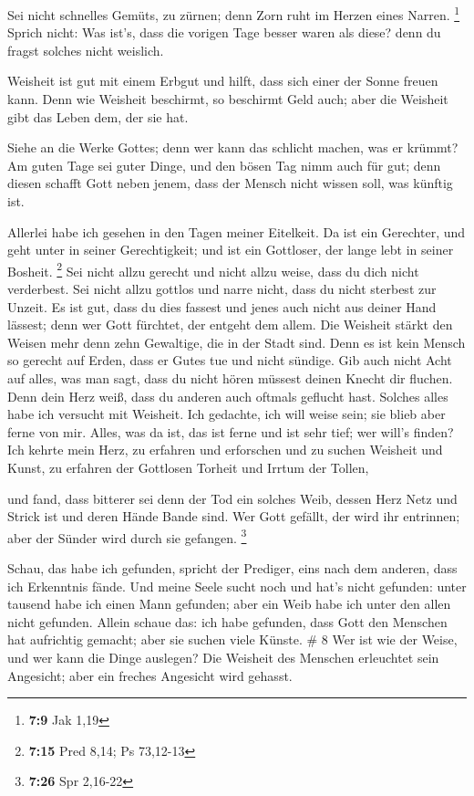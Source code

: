  Sei nicht schnelles Gemüts, zu zürnen; denn Zorn ruht im
Herzen eines Narren. \footnote{\textbf{7:9} Jak 1,19} 
Sprich nicht: Was ist's, dass die vorigen Tage besser waren als diese?
denn du fragst solches nicht weislich.

 Weisheit ist gut mit einem Erbgut und hilft, dass sich
einer der Sonne freuen kann.  Denn wie Weisheit beschirmt,
so beschirmt Geld auch; aber die Weisheit gibt das Leben dem, der sie
hat.

 Siehe an die Werke Gottes; denn wer kann das schlicht
machen, was er krümmt?  Am guten Tage sei guter Dinge, und
den bösen Tag nimm auch für gut; denn diesen schafft Gott neben jenem,
dass der Mensch nicht wissen soll, was künftig ist.

 Allerlei habe ich gesehen in den Tagen meiner Eitelkeit.
Da ist ein Gerechter, und geht unter in seiner Gerechtigkeit; und ist
ein Gottloser, der lange lebt in seiner Bosheit. \footnote{\textbf{7:15}
  Pred 8,14; Ps 73,12-13}  Sei nicht allzu gerecht und
nicht allzu weise, dass du dich nicht verderbest.  Sei
nicht allzu gottlos und narre nicht, dass du nicht sterbest zur Unzeit.
 Es ist gut, dass du dies fassest und jenes auch nicht aus
deiner Hand lässest; denn wer Gott fürchtet, der entgeht dem allem.
 Die Weisheit stärkt den Weisen mehr denn zehn Gewaltige,
die in der Stadt sind.  Denn es ist kein Mensch so gerecht
auf Erden, dass er Gutes tue und nicht sündige.  Gib auch
nicht Acht auf alles, was man sagt, dass du nicht hören müssest deinen
Knecht dir fluchen.  Denn dein Herz weiß, dass du anderen
auch oftmals geflucht hast.  Solches alles habe ich
versucht mit Weisheit. Ich gedachte, ich will weise sein; sie blieb aber
ferne von mir.  Alles, was da ist, das ist ferne und ist
sehr tief; wer will's finden?  Ich kehrte mein Herz, zu
erfahren und erforschen und zu suchen Weisheit und Kunst, zu erfahren
der Gottlosen Torheit und Irrtum der Tollen,

 und fand, dass bitterer sei denn der Tod ein solches Weib,
dessen Herz Netz und Strick ist und deren Hände Bande sind. Wer Gott
gefällt, der wird ihr entrinnen; aber der Sünder wird durch sie
gefangen. \footnote{\textbf{7:26} Spr 2,16-22}

 Schau, das habe ich gefunden, spricht der Prediger, eins
nach dem anderen, dass ich Erkenntnis fände.  Und meine
Seele sucht noch und hat's nicht gefunden: unter tausend habe ich einen
Mann gefunden; aber ein Weib habe ich unter den allen nicht gefunden.
 Allein schaue das: ich habe gefunden, dass Gott den
Menschen hat aufrichtig gemacht; aber sie suchen viele Künste. \# 8
 Wer ist wie der Weise, und wer kann die Dinge auslegen? Die
Weisheit des Menschen erleuchtet sein Angesicht; aber ein freches
Angesicht wird gehasst.


